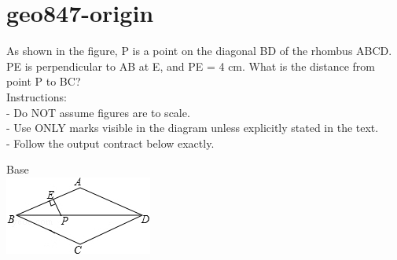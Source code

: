 \documentclass[12pt]{article}
\begin{document}
\section*{geo847-origin}
\noindent\begin{minipage}{\textwidth}
\setlength{\parskip}{4pt}
As shown in the figure, P is a point on the diagonal BD of the rhombus ABCD. PE is perpendicular to AB at E, and PE = 4 cm. What is the distance from point P to BC?\\
Instructions:\\
- Do NOT assume figures are to scale.\\
- Use ONLY marks visible in the diagram unless explicitly stated in the text.\\
- Follow the output contract below exactly.\\
\end{minipage}
\begin{center}
\begin{minipage}{0.32\textwidth}\centering
Base\\
\includegraphics[width=0.95\linewidth]{out_rommath_origin/items/geo847-origin/assets/figure.png}
\end{minipage}
\par
\end{center}
\bigskip
\end{document}
